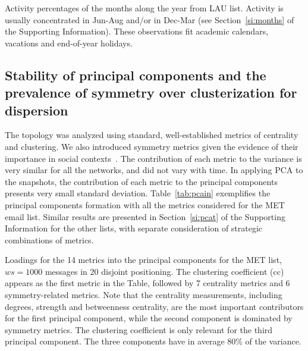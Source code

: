 \documentclass[%
	aip,
	jmp,%
	amsmath,amssymb,
	reprint,%
]{revtex4-1}
\begin{document}
\begin{table}
	\caption{Activity percentages of the months along the year from LAU list. Activity is usually concentrated in Jun-Aug and/or in Dec-Mar (see Section~\ref{si:months} of the Supporting Information). These observations fit academic calendars, vacations and end-of-year holidays.}
	\footnotesize
	
	\label{tab:min2}
\end{table}
\subsection{Stability of principal components and the prevalence of symmetry over clusterization for dispersion}\label{prevalence}
The topology was analyzed using standard, well-established metrics of centrality and clustering.
We also introduced symmetry metrics given the evidence of their importance in social contexts~\cite{newmanEvolving}.
The contribution of each metric to the variance is very similar for all the networks, and did not vary with time.
In applying PCA to the snapshots, the contribution of each metric to the principal components presents very small standard deviation. Table~\ref{tab:pcain} exemplifies the principal components formation with all the metrics considered for the MET email list. Similar results are presented in Section~\ref{si:pcat} of the Supporting Information for the other lists, with separate consideration of strategic combinations of metrics.

\begin{table}[!h]
	\caption{Loadings for the 14 metrics into the principal components for the MET list, $ws=1000$ messages in 20 disjoint positioning. The clustering coefficient (cc) appears as the first metric in the Table, followed by 7 centrality metrics and 6 symmetry-related metrics. Note that the centrality measurements, including degrees, strength and betweenness centrality, are the most important contributors for the first principal component, while the second component is dominated by symmetry metrics. The clustering coefficient is only relevant for the third principal component. The three components have in average 80\% of the variance.}
		\footnotesize
		
		\label{tab:pcain}
	\end{table}
\end{document}
